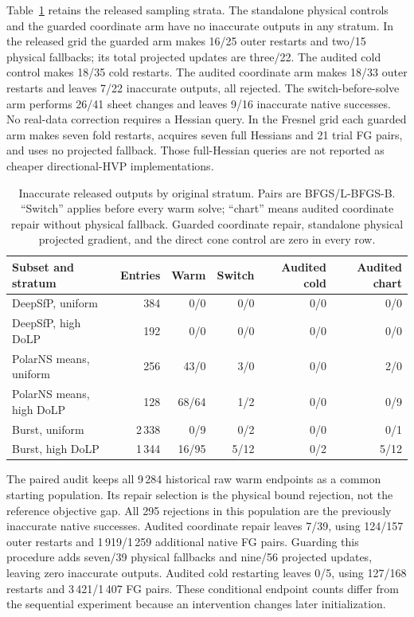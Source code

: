 \documentclass[10pt,a4paper]{article}
\begin{document}
Table~\ref{tab:chartstrata} retains the released sampling strata. The standalone physical controls and the guarded coordinate arm have no inaccurate outputs in any stratum. In the released grid the guarded arm makes 16/25 outer restarts and two/15 physical fallbacks; its total projected updates are three/22. The audited cold control makes 18/35 cold restarts. The audited coordinate arm makes 18/33 outer restarts and leaves 7/22 inaccurate outputs, all rejected. The switch-before-solve arm performs 26/41 sheet changes and leaves 9/16 inaccurate native successes. No real-data correction requires a Hessian query. In the Fresnel grid each guarded arm makes seven fold restarts, acquires seven full Hessians and 21 trial FG pairs, and uses no projected fallback. Those full-Hessian queries are not reported as cheaper directional-HVP implementations.

\begin{table}[!t]
\caption{Inaccurate released outputs by original stratum. Pairs are BFGS/L-BFGS-B. ``Switch'' applies before every warm solve; ``chart'' means audited coordinate repair without physical fallback. Guarded coordinate repair, standalone physical projected gradient, and the direct cone control are zero in every row.}
\label{tab:chartstrata}
\centering\small\renewcommand{\arraystretch}{1.12}
\begin{tabularx}{\textwidth}{@{}Xrrrrr@{}}\toprule
Subset and stratum & Entries & Warm & Switch & Audited cold & Audited chart\\\midrule
DeepSfP, uniform & 384 & 0/0 & 0/0 & 0/0 & 0/0\\
DeepSfP, high DoLP & 192 & 0/0 & 0/0 & 0/0 & 0/0\\
PolarNS means, uniform & 256 & 43/0 & 3/0 & 0/0 & 2/0\\
PolarNS means, high DoLP & 128 & 68/64 & 1/2 & 0/0 & 0/9\\
Burst, uniform & 2\,338 & 0/9 & 0/2 & 0/0 & 0/1\\
Burst, high DoLP & 1\,344 & 16/95 & 5/12 & 0/2 & 5/12\\
\bottomrule\end{tabularx}
\end{table}

The paired audit keeps all 9\,284 historical raw warm endpoints as a common starting population. Its repair selection is the physical bound rejection, not the reference objective gap. All 295 rejections in this population are the previously inaccurate native successes. Audited coordinate repair leaves 7/39, using 124/157 outer restarts and 1\,919/1\,259 additional native FG pairs. Guarding this procedure adds seven/39 physical fallbacks and nine/56 projected updates, leaving zero inaccurate outputs. Audited cold restarting leaves 0/5, using 127/168 restarts and 3\,421/1\,407 FG pairs. These conditional endpoint counts differ from the sequential experiment because an intervention changes later initialization.
\end{document}
